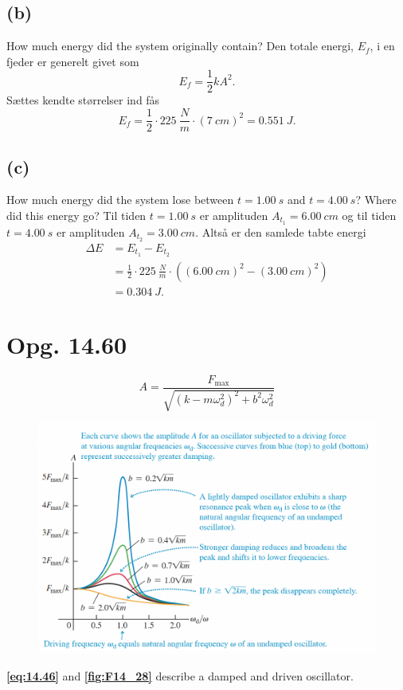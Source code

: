 \documentclass[12pt]{article}
\theoremstyle{definition}
\begin{document}
\subsection*{(b)}
How much energy did the system originally contain?
\bigbreak
Den totale energi, $E_f$, i en fjeder er generelt givet som
\[ 
E_f = \frac{1}{2}kA^2
.\]
Sættes kendte størrelser ind fås
\[ 
E_f = \frac{1}{2}\cdot \qty{225}{\frac{N}{m}} \cdot \left( \qty{7}{cm}  \right)^2 = \qty{0,551}{J} 
.\]


\subsection*{(c)}
How much energy did the system lose between $t = \qty{1,00}{s}$ and $t = \qty{4,00}{s}$? Where did this energy go?
\bigbreak
Til tiden $t = \qty{1,00}{s}$ er amplituden $A_{t_1} = \qty{6,00}{cm}$ og til tiden $t = \qty{4,00}{s}$ er amplituden $A_{t_2} = \qty{3,00}{cm}$. Altså er den samlede tabte energi
\begin{align*}
  \Delta E &= E_{t_1} - E_{t_2} \\
  &= \frac{1}{2} \cdot \qty{225}{\frac{N}{m}} \cdot \left( (\qty{6,00}{cm})^2 - (\qty{3,00}{cm})^2  \right)  \\
  &= \qty{0,304}{J} 
.\end{align*}


\section*{Opg. 14.60}
\begin{equation} \label{eq:14.46}
  A = \frac{F_{\text{max}}}{\sqrt{\left( k - m \omega_d^2 \right)^2 + b^2 \omega_d^2}}
\end{equation}
\begin{figure} [ht]
  \centering
  \caption{}
  \includegraphics[width=0.5\linewidth]{../figures/F14_28.png}
  \label{fig:F14_28}
\end{figure}

\textbf{\autoref{eq:14.46}} and \textbf{\autoref{fig:F14_28}} describe a damped and driven oscillator.
\end{document}
